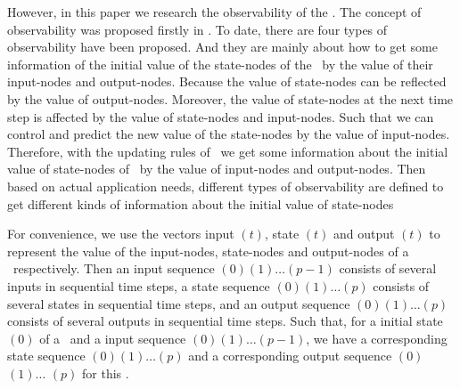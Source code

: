 However, in this paper we research the observability of the \BCNs. The concept of observability was proposed firstly in \cite{cheng2009controllability}. To date, there are four types of observability have been proposed. And they are mainly about how to get some information of the initial value of the state-nodes of the \BCNs\ by the value of their input-nodes and output-nodes. Because the value of state-nodes can be reflected by the value of output-nodes. Moreover, the value of state-nodes at the next time step is affected by the value of state-nodes and input-nodes. Such that we can control and predict the new value of the state-nodes by the value of input-nodes. Therefore, with the updating rules of \BCNs\ we get some information about the initial value of state-nodes of \BCNs\ by the value of input-nodes and output-nodes. Then based on actual application needs, different types of observability are defined to get different kinds of information about the initial value of state-nodes%

For convenience, we use the vectors input \Input$(t)$, state \State$(t)$ and output \Output$(t)$ to represent the value of the input-nodes, state-nodes and output-nodes of a \BCN\ respectively. Then an input sequence \Input$(0)$\Input$(1)\ldots$\Input$(p-1)$ consists of several inputs in sequential time steps, a state sequence \State$(0) $\State$(1)\ldots$\State$(p)$ consists of several states in sequential time steps, and an output sequence \Output$(0)$\Output$(1)\ldots$\Output$(p)$ consists of several outputs in sequential time steps. Such that, for a initial state \State$(0)$ of a \BCN\ and a input sequence \Input$(0)$\Input$(1)\ldots$\Input$(p-1)$, we have a corresponding state sequence \State$(0) $\State$(1)\ldots $\State$(p)$ and a corresponding output sequence \Output$(0) $\Output$(1)\ldots$ \Output$(p)$ for this \BCN.

